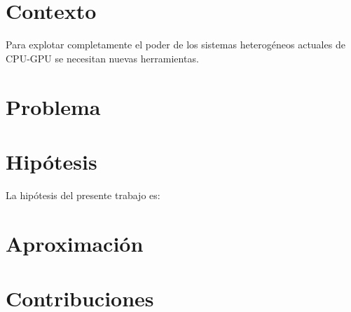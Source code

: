 
\section{Contexto}

Para explotar completamente el poder de los sistemas heterogéneos actuales de CPU-GPU se necesitan nuevas herramientas.

\section{Problema}


\section{Hipótesis}

La hipótesis del presente trabajo es:

\begin{quote}
\end{quote}


\section{Aproximación}


\section{Contribuciones}



